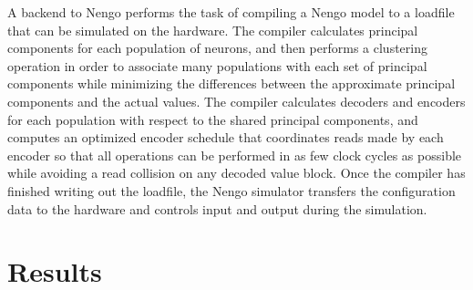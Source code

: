 \documentclass[english]{article}
\begin{document}
A backend to Nengo performs the task of compiling a Nengo model to a loadfile that can be
simulated on the hardware. The compiler calculates principal components for each population
of neurons, and then performs a clustering operation in order to associate many
populations with each set of principal components while minimizing the differences
between the approximate principal components and the actual values. %
The compiler calculates decoders and encoders for each population with respect
to the shared principal components, and computes an optimized encoder schedule %
that coordinates reads made by each encoder so that all operations can be performed
in as few clock cycles as possible while avoiding a read collision on any decoded value block.
Once the compiler has finished writing out the loadfile, the Nengo simulator
transfers the configuration data to the hardware and controls input and output during the simulation.


\section{Results}




\end{document}
